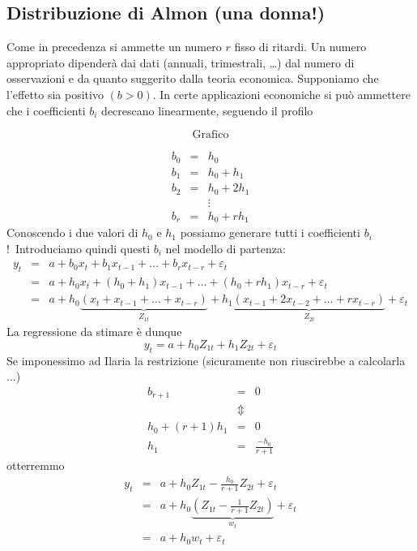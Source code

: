 \documentclass[a4paper]{report}
\theoremstyle{remark}
\begin{document}
\subsection{\label{ritardi almon}Distribuzione di Almon (una donna!)}

Come in precedenza si ammette un numero $r$ fisso di ritardi. Un numero
appropriato dipender\`{a} dai dati (annuali, trimestrali, \ldots ) dal
numero di osservazioni e da quanto suggerito dalla teoria economica.
Supponiamo che l'effetto sia positivo $(b>0)$. In certe applicazioni
economiche si pu\`{o} ammettere che i coefficienti $b_{i}$ decrescano
linearmente, seguendo il profilo

\begin{equation*}
\text{Grafico}
\end{equation*}%
\vspace{5cm}

\begin{eqnarray*}
b_{0} &=&h_{0} \\
b_{1} &=&h_{0}+h_{1} \\
b_{2} &=&h_{0}+2h_{1} \\
&&\vdots \\
b_{r} &=&h_{0}+rh_{1}
\end{eqnarray*}%
Conoscendo i due valori di $h_{0}$ e $h_{1}$ possiamo generare tutti i
coefficienti $b_{i}$!\ Introduciamo quindi questi $b_{i}$ nel modello di
partenza:%
\begin{eqnarray*}
y_{t} &=&a+b_{0}x_{t}+b_{1}x_{t-1}+\ldots +b_{r}x_{t-r}+\varepsilon _{t} \\
&=&a+h_{0}x_{t}+\left( h_{0}+h_{1}\right) x_{t-1}+\ldots +\left(
h_{0}+rh_{1}\right) x_{t-r}+\varepsilon _{t} \\
&=&a+h_{0}\underset{Z_{1t}}{\underbrace{\left( x_{t}+x_{t-1}+\ldots
+x_{t-r}\right) }}+h_{1}\underset{Z_{2t}}{\underbrace{\left(
x_{t-1}+2x_{t-2}+\ldots +rx_{t-r}\right) }}+\varepsilon _{t}
\end{eqnarray*}%
La regressione da stimare \`{e} dunque%
\begin{equation*}
y_{t}=a+h_{0}Z_{1t}+h_{1}Z_{2t}+\varepsilon _{t}
\end{equation*}%
Se imponessimo ad Ilaria la restrizione (sicuramente non riuscirebbe a
calcolarla ...)%
\begin{eqnarray*}
b_{r+1} &=&0 \\
&\Updownarrow & \\
h_{0}+(r+1)h_{1} &=&0 \\
h_{1} &=&\frac{-h_{0}}{r+1}
\end{eqnarray*}%
otterremmo%
\begin{eqnarray*}
y_{t} &=&a+h_{0}Z_{1t}-\frac{h_{0}}{r+1}Z_{2t}+\varepsilon _{t} \\
&=&a+h_{0}\underset{w_{t}}{\underbrace{\left( Z_{1t}-\frac{1}{r+1}%
Z_{2t}\right) }}+\varepsilon _{t} \\
&=&a+h_{0}w_{t}+\varepsilon _{t}
\end{eqnarray*}
\end{document}
